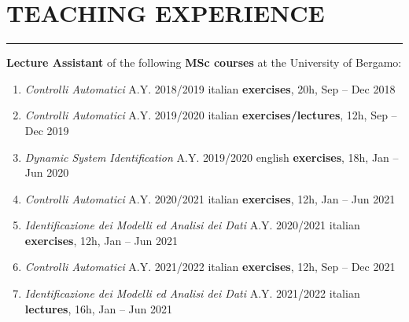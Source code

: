 \documentclass[10pt]{article}
\newcommand{\cvsection}[1]{\section*{\centering\normalsize\uppercase{#1}}\vspace{-16pt}\rule{\linewidth}{0.2pt}\vspace{6pt}}
\begin{document}
\vspace{-20pt}
\cvsection{teaching experience}
\textbf{Lecture Assistant} of the following \textbf{MSc courses} at the University of Bergamo:
\vspace{-6pt}
\begin{enumerate}
	\setlength\itemsep{-16pt}
	\item \textit{Controlli Automatici} A.Y. 2018/2019 \hfill italian \textbf{exercises}, 20h, Sep – Dec 2018\\
	\item \textit{Controlli Automatici} A.Y. 2019/2020 \hfill italian \textbf{exercises/lectures}, 12h, Sep – Dec 2019\\
	\item \textit{Dynamic System Identification} A.Y. 2019/2020 \hfill english \textbf{exercises}, 18h, Jan – Jun 2020\\
	\item \textit{Controlli Automatici} A.Y. 2020/2021 \hfill italian \textbf{exercises}, 12h, Jan – Jun 2021\\
	\item \textit{Identificazione dei Modelli ed Analisi dei Dati} A.Y. 2020/2021 \hfill italian \textbf{exercises}, 12h, Jan – Jun 2021\\
	\item \textit{Controlli Automatici} A.Y. 2021/2022 \hfill italian \textbf{exercises}, 12h, Sep – Dec 2021\\
	\item \textit{Identificazione dei Modelli ed Analisi dei Dati} A.Y. 2021/2022 \hfill italian \textbf{lectures}, 16h, Jan – Jun 2021
\end{enumerate}

\vspace{6pt} %
\end{document}

